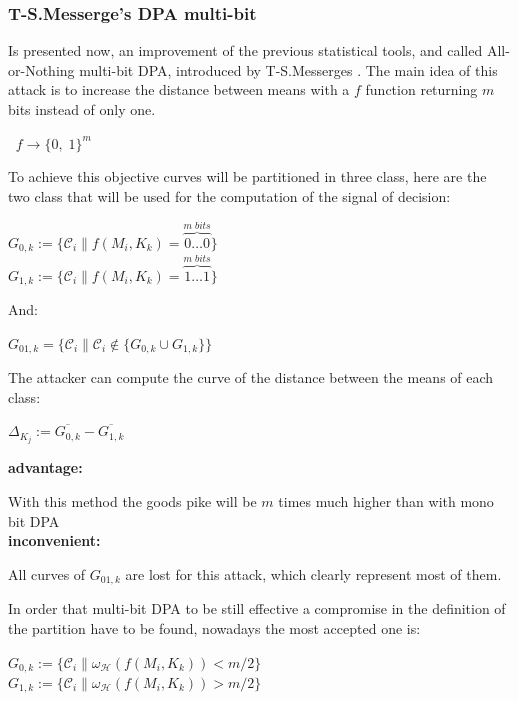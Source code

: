 \subsubsection{T-S.Messerge's DPA multi-bit}
Is presented now, an improvement of the previous statistical tools,
and called All-or-Nothing multi-bit DPA, introduced by T-S.Messerges . 
The main idea of this attack is to increase the distance between means with a $f$ function
returning $m$ bits instead of only one.  
\begin{center}
$ \;\; f \longrightarrow  \{0,\;1\}^m$ \\
\end{center}

To achieve this objective curves will be partitioned in three class, here are the two class
that will be used for the computation of the signal of decision:
\begin{center}
$G_{0,k} := \{  \mathcal{C}_i  \| f(M_i,K_k) = \overbrace{0\hdots0}^{m \; bits} \}$\\
$G_{1,k} := \{  \mathcal{C}_i  \| f(M_i,K_k) = \overbrace{1\hdots1}^{m \; bits} \}$\\
\end{center}
And:
\begin{center}
$G_{01,k} = \{  \mathcal{C}_i   \| \mathcal{C}_i    \notin \{ G_{0,k} \cup G_{1,k} \} \}$
\end{center}
The attacker can compute the curve of the distance between the means of each class:
\begin{center}
$ \Delta_{K_j}  := \overline{G_{0,k}}-  \overline{G_{1,k}}$
\end{center}
\textbf{advantage:}

With this method the goods pike will be $m$ times much higher than with mono bit DPA\\
\textbf{inconvenient:}

All curves of $G_{01,k} $ are lost for this attack, which clearly represent
most of them.

In order that multi-bit DPA to be still effective a compromise in the definition
of the partition have to be found, nowadays the most accepted one is: 
\begin{center}
$G_{0,k} := \{  \mathcal{C}_i  \|   \omega_{\mathcal{H}}( f(M_i,K_k) ) < m/2 \}$\\
$G_{1,k} := \{  \mathcal{C}_i  \|   \omega_{\mathcal{H}}( f(M_i,K_k) ) > m/2 \}$\\
\end{center}

